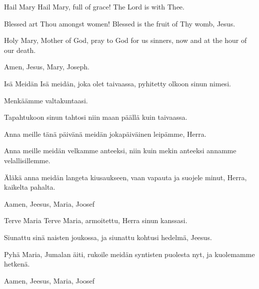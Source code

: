   \begin{passage}[EN]{Hail Mary}
    Hail Mary,
    full of grace!
    The Lord is with Thee.
    \par
    Blessed art Thou amongst women!
    Blessed is the fruit of Thy womb, Jesus.
    \par
    Holy Mary, Mother of God,
    pray to God for us sinners,
    now and at the hour of our death.
    \par
    Amen, Jesus, Mary, Joseph.
  \end{passage}
  \vspace*{\fill}
  \hardbrk
  \vspace*{\fill}
  \begin{passage}[FI]{Isä Meidän}
    Isä meidän, joka olet taivaassa,
    pyhitetty olkoon sinun nimesi.
    \par
    Menkäämme valtakuntaasi.
    \par
    Tapahtukoon sinun tahtosi niin
    maan päällä kuin taivaassa.
    \par
    Anna meille tänä päivänä meidän
    jokapäiväinen leipämme, Herra.
    \par
    Anna meille meidän velkamme anteeksi,
    niin kuin mekin anteeksi annamme velallisillemme.
    \par
    Äläkä anna meidän langeta kiusaukseen,
    vaan vapauta ja suojele minut,
    Herra, kaikelta pahalta.
    \par
    Aamen, Jeesus, Maria, Joosef
  \end{passage}
  \begin{passage}[FI]{Terve Maria}
    Terve Maria, armoitettu,
    Herra sinun kanssasi.
    \par
    Siunattu sinä naisten joukossa,
    ja siunattu kohtusi hedelmä, Jeesus.
    \par
    Pyhä Maria, Jumalan äiti, rukoile meidän
    syntisten puolesta nyt, ja kuolemamme hetkenä.
    \par
    Aamen, Jeesus, Maria, Joosef
  \end{passage}
  \vspace*{\fill}
\endsong


